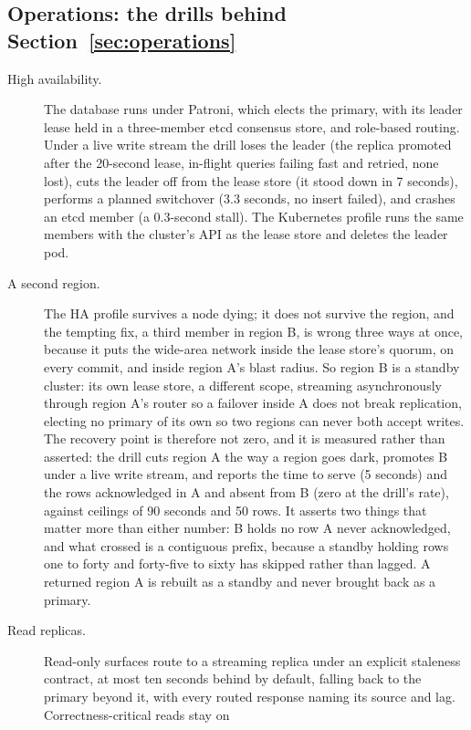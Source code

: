 \subsection*{Operations: the drills behind Section~\ref{sec:operations}}

\begin{description}
  \item[High availability.] The database runs under Patroni, which elects the primary, with its leader lease
    held in a three-member etcd consensus store, and role-based routing. Under a live write stream the drill loses the leader (the replica
    promoted after the 20-second lease, in-flight queries failing fast and retried, none lost), cuts
    the leader off from the lease store (it stood down in 7 seconds), performs a planned switchover
    (3.3 seconds, no insert failed), and crashes an etcd member (a 0.3-second stall). The Kubernetes
    profile runs the same members with the cluster's API as the lease store and deletes the leader
    pod. \sImpl
  \item[A second region.] The HA profile survives a node dying; it does not survive the region, and
    the tempting fix, a third member in region B, is wrong three ways at once, because it puts the
    wide-area network inside the lease store's quorum, on every commit, and inside region A's blast
    radius. So region B is a standby cluster: its own lease store, a different
    scope, streaming asynchronously through region A's router so a failover inside A does not break
    replication, electing no primary of its own so two regions can never both accept writes. The
    recovery point is therefore not zero, and it is measured rather than asserted: the drill cuts
    region A the way a region goes dark, promotes B under a live write stream, and reports the time
    to serve (5 seconds) and the rows acknowledged in A and absent from B (zero at the drill's
    rate), against ceilings of 90 seconds and 50 rows. It asserts two things that matter more than
    either number: B holds no row A never acknowledged, and what crossed is a contiguous prefix,
    because a standby holding rows one to forty and forty-five to sixty has skipped rather than
    lagged. A returned region A is rebuilt as a standby and never brought back as a primary. \sImpl
  \item[Read replicas.] Read-only surfaces route to a streaming replica under an explicit
    staleness contract, at most ten seconds behind by default, falling back to the primary beyond
    it, with every routed response naming its source and lag. Correctness-critical reads stay on

\end{description}
